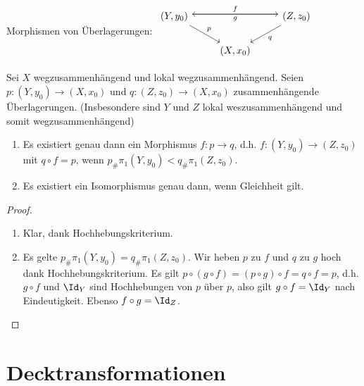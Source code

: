Morphismen von Überlagerungen:
\begin{math}
    \begin{tikzcd}
        (Y,y_0) \ar[rd,"p"] \ar[rr,"f",shift left] & & (Z,z_0) \ar[ll,"g", shift right] \ar[ld,"q"] \\
        & (X, x_0) &
    \end{tikzcd}
\end{math}

\begin{st}
    Sei $X$ wegzusammenhängend und lokal wegzusammenhängend.
    Seien $p: (Y, y_0) \to (X, x_0)$ und $q: (Z, z_0) \to (X, x_0)$ zusammenhängende Überlagerungen.
    (Insbesondere sind $Y$ und $Z$ lokal weszusammenhängend und somit wegzusammenhängend)
    \begin{enumerate}[1)]
        \item
            Es existiert genau dann ein Morphismus $f: p \to q$, d.h. $f: (Y, y_0) \to (Z, z_0)$ mit $q \circ f = p$, wenn $p_\# \pi_1(Y,y_0) < q_\# \pi_1(Z,z_0)$.
        \item
            Es existiert ein Isomorphismus genau dann, wenn Gleichheit gilt.
    \end{enumerate}
    \begin{proof}
        \begin{enumerate}[1)]
            \item
                Klar, dank Hochhebungskriterium.
            \item
                Es gelte $p_\# \pi_1(Y,y_0) = q_\# \pi_1(Z, z_0)$.
                Wir heben $p$ zu $f$ und $q$ zu $g$ hoch dank Hochhebungskriterium.
                Es gilt $p \circ (g \circ f) = (p \circ g) \circ f = q \circ f = p$, d.h. $g \circ f$ und $\id_Y$ sind Hochhebungen von $p$ über $p$, also gilt $g \circ f = \id_Y$ nach Eindeutigkeit.
                Ebenso $f \circ g = \id_Z$.
        \end{enumerate}
    \end{proof}
\end{st}


\section{Decktransformationen}

